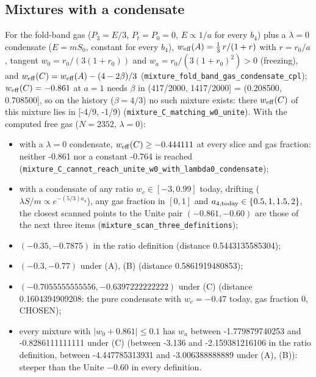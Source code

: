 \documentclass[11pt]{article}
\begin{document}
\subsection{Mixtures with a condensate}

For the fold-band gas ($P_3 = E/3$, $P_t = P_0 = 0$, $E \propto 1/a$ for every $b_4$) plus a $\lambda = 0$ condensate ($E = mS_0$, constant for every $b_4$), $w_{\rm eff}(A) = \frac13\,r/(1+r)$ with $r = r_0/a$, tangent $w_0 = r_0/(3(1 + r_0))$ and $w_a = r_0/(3(1 + r_0)^2) > 0$ (freezing), and $w_{\rm eff}(C) = w_{\rm eff}(A) - (4 - 2\beta)/3$ (\texttt{mixture\_\allowbreak{}fold\_ban\allowbreak{}d\_gas\_co\allowbreak{}ndensate\allowbreak{}\_cpl}); $w_{\rm eff}(C) = -0.861$ at $a = 1$ needs $\beta$ in (417/2000, 1417/2000] = (0.208500, 0.708500], so on the history ($\beta = 4/3$) no such mixture exists: there $w_{\rm eff}(C)$ of this mixture lies in [-4/9, -1/9) (\texttt{mixture\_\allowbreak{}C\_matchi\allowbreak{}ng\_w0\_un\allowbreak{}ite}). With the computed free gas ($N = 2352$, $\lambda = 0$):

\begin{itemize}
\item with a $\lambda = 0$ condensate, $w_{\rm eff}(C) \geq -0.444111$ at every slice and gas fraction: neither -0.861 nor a constant -0.764 is reached (\texttt{mixture\_\allowbreak{}C\_cannot\allowbreak{}\_reach\_u\allowbreak{}nite\_w0\_\allowbreak{}with\_lam\allowbreak{}bda0\_con\allowbreak{}densate});
\item with a condensate of any ratio $w_c \in [-3, 0.99]$ today, drifting ($\lambda S/m \propto e^{-(5/3)a_4}$), any gas fraction in $[0, 1]$ and $a_{4,\rm today} \in \{0.5, 1, 1.5, 2\}$, the closest scanned points to the Unite pair $(-0.861, -0.60)$ are those of the next three items (\texttt{mixture\_\allowbreak{}scan\_thr\allowbreak{}ee\_defin\allowbreak{}itions});
\item $(-0.35, -0.7875)$ in the ratio definition (distance 0.5443135585304);
\item $(-0.3, -0.77)$ under (A), (B) (distance 0.5861919480853);
\item $(-0.7055555555556, -0.6397222222222)$ under (C) (distance 0.1604394909208: the pure condensate with $w_c = -0.47$ today, gas fraction 0, CHOSEN);
\item every mixture with $|w_0 + 0.861| \leq 0.1$ has $w_a$ between -1.779879740253 and -0.8286111111111 under (C) (between -3.136 and -2.159381216106 in the ratio definition, between -4.447785313931 and -3.006388888889 under (A), (B)): steeper than the Unite $-0.60$ in every definition.
\end{itemize}
\end{document}
